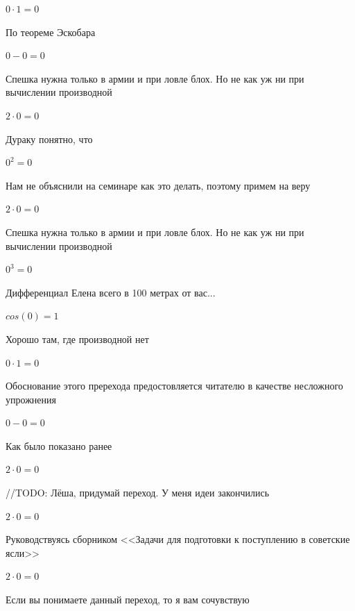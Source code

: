 \documentclass[12pt,a4paper,fleqn]{article}
\begin{document}
\begin{center}$0 \cdot 1 = 0$\end{center}
По теореме Эскобара

\begin{center}$0-0 = 0$\end{center}
Спешка нужна только в армии и при ловле блох. Но не как уж ни при вычислении производной\cite{link2}

\begin{center}$2 \cdot 0 = 0$\end{center}
Дураку понятно, что

\begin{center}$0^{2} = 0$\end{center}
Нам не объяснили на семинаре как это делать, поэтому примем на веру

\begin{center}$2 \cdot 0 = 0$\end{center}
Спешка нужна только в армии и при ловле блох. Но не как уж ни при вычислении производной\cite{link2}

\begin{center}$0^{3} = 0$\end{center}
Дифференциал Елена всего в 100 метрах от вас...

\begin{center}$cos(0) = 1$\end{center}
Хорошо там, где производной нет\cite{link2}

\begin{center}$0 \cdot 1 = 0$\end{center}
Обоснование этого пререхода предостовляется читателю в качестве несложного упрожнения

\begin{center}$0-0 = 0$\end{center}
Как было показано ранее

\begin{center}$2 \cdot 0 = 0$\end{center}
//TODO: Лёша, придумай переход. У меня идеи закончились

\begin{center}$2 \cdot 0 = 0$\end{center}
Руководствуясь сборником <<Задачи для подготовки к поступлению в советские ясли>>\cite{link1}

\begin{center}$2 \cdot 0 = 0$\end{center}
Если вы понимаете данный переход, то я вам сочувствую
\end{document}
